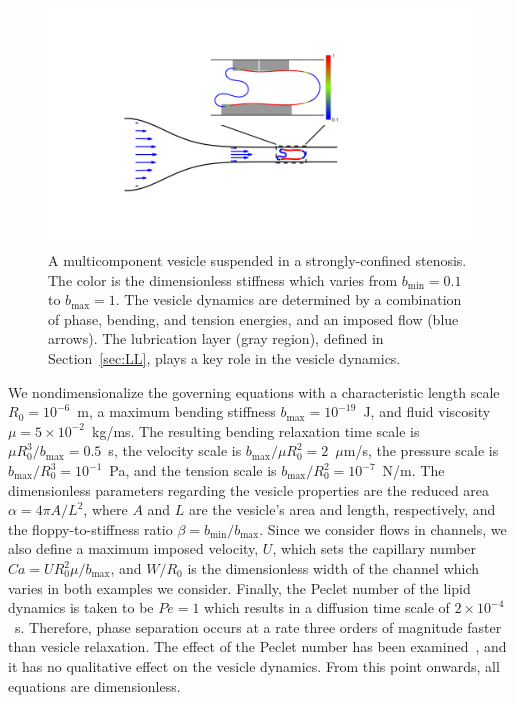 \documentclass[twoside,twocolumn,9pt]{article}
\begin{document}
\begin{figure}[h]
  \centering
  \includegraphics[width=0.9\columnwidth]{figures/schematic.pdf}
  \caption{\label{fig:schematic}\small A multicomponent vesicle
  suspended in a strongly-confined stenosis. The color is the
  dimensionless stiffness which varies from $b_{\min} = 0.1$ to
  $b_{\max} = 1$. The vesicle dynamics are determined by a combination
  of phase, bending, and tension energies, and an imposed flow (blue
  arrows). The lubrication layer (gray region), defined in
  Section~\ref{sec:LL}, plays a key role in the vesicle dynamics.}
\end{figure}
We nondimensionalize the governing equations with a characteristic
length scale $R_0 = 10^{-6}$~m, a maximum bending stiffness $b_{\max} =
10^{-19}$~J, and fluid viscosity $\mu = 5 \times 10^{-2}$~kg/ms. The
resulting bending relaxation time scale is $\mu R_0^3/b_{\max} = 0.5$~s,
the velocity scale is $b_{\max}/\mu R_0^2=2$~$\mu$m/s, the pressure
scale is $b_{\max}/R_0^3 = 10^{-1}$~Pa, and the tension scale is
$b_{\max}/R_0^2 = 10^{-7}$~N/m. The dimensionless parameters regarding
the vesicle properties are the reduced area $\alpha = 4\pi A/L^2$, where
$A$ and $L$ are the vesicle's area and length, respectively, and the
floppy-to-stiffness ratio $\beta = b_{\min}/b_{\max}$. Since we consider
flows in channels, we also define a maximum imposed velocity, $U$, which
sets the capillary number $Ca = U R_{0}^{2} \mu/b_{\max}$, and $W/R_0$
is the dimensionless width of the channel which varies in both examples
we consider. Finally, the Peclet number of the lipid dynamics is taken
to be $Pe = 1$ which results in a diffusion time scale of $2 \times
10^{-4}$~s. Therefore, phase separation occurs at a rate three orders of
magnitude faster than vesicle relaxation. The effect of the Peclet
number has been examined~\cite{liu-mar-li-vee-low2017,
soh-tse-li-voi-low2010}, and it has no qualitative effect on the vesicle
dynamics. From this point onwards, all equations are dimensionless.
\end{document}

